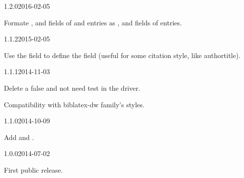 \documentclass{ltxdockit}[2011/03/25]
\begin{document}
\begin{changelog}


\begin{release}{1.2.0}{2016-02-05}
\item Formate   ,  and  fields of   and  entries as ,  and  fields of  entries.
\end{release}

\begin{release}{1.1.2}{2015-02-05}
\item Use the  field to define the  field (useful for some citation style, like authortitle).
\end{release}

\begin{release}{1.1.1}{2014-11-03}
\item Delete a false and not need test in the driver.
\item Compatibility with biblatex-dw family's styles.
\end{release}
\begin{release}{1.1.0}{2014-10-09}
\item Add  and .
\end{release}

\begin{release}{1.0.0}{2014-07-02}
\item First public release.
\end{release}
\end{changelog}
\end{document}
